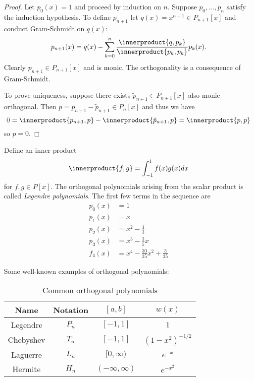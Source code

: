 \documentclass[a4paper]{article}
\newcommand*{\inner}{\innerproduct}
\begin{document}
\begin{proof}
  Let \(p_0(x) = 1\) and proceed by induction on \(n\). Suppose \(p_0, \dots, p_n\) satisfy the induction hypothesis. To define \(p_{n + 1}\) let \(q(x) = x^{n + 1} \in P_{n + 1}[x]\) and conduct Gram-Schmidt on \(q(x)\):
  \[
    p_{n + 1}(x) = q(x) - \sum_{k = 0}^n \frac{\inner{q, p_k}}{\inner{p_k, p_k}}p_k(x).
  \]
  Clearly \(p_{n + 1} \in P_{n + 1}[x]\) and is monic. The orthogonality is a consequence of Gram-Schmidt.

  To prove uniqueness, suppose there exists \(\tilde p_{n + 1} \in P_{n + 1}[x]\) also monic orthogonal. Then \(p = p_{n + 1} - \tilde p_{n + 1} \in P_n[x]\) and thus we have
  \[
    0 = \inner{p_{n + 1}, p} - \inner{\tilde p_{n + 1}, p} = \inner{p, p}
  \]
  so \(p = 0\).
\end{proof}

\begin{eg}
  Define an inner product
  \[
    \inner{f, g} = \int_{-1}^1 f(x)g(x) dx
  \]
  for \(f, g \in P[x]\). The orthogonal polynomials arising from the scalar product is called \emph{Legendre polynomials}. The first few terms in the sequence are
  \begin{align*}
    p_0(x) &= 1 \\
    p_1(x) &= x \\
    p_2(x) &= x^2 - \frac{1}{3} \\
    p_3(x) &= x^3 - \frac{3}{5}x \\
    f_4(x) &= x^4 - \frac{30}{35}x^2 + \frac{3}{35}
  \end{align*}
\end{eg}

Some well-known examples of orthogonal polynomials:
\begin{table}[h!]
  \centering
  \begin{tabular}{|c||c|c|c|}
    \hline
    Name & Notation & \([a, b]\) & \(w(x)\) \\ \hline
    Legendre & \(P_n\) & \([-1, 1]\) & \(1\) \\ \hline
    Chebyshev & \(T_n\) & \([-1, 1]\) & \((1 - x^2)^{-1/2}\) \\ \hline
    Laguerre & \(L_n\) & \([0, \infty)\) & \(e^{-x}\) \\ \hline
    Hermite & \(H_n\) & \((-\infty, \infty)\) & \(e^{-x^2}\) \\ \hline
  \end{tabular}
  \caption{Common orthogonal polynomials}
\end{table}
\end{document}

